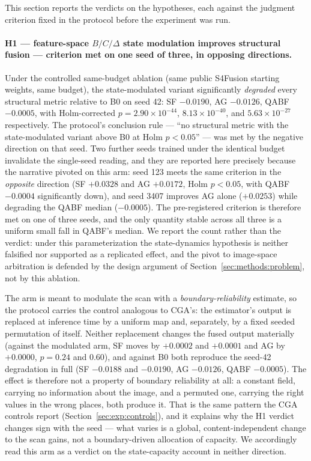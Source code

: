 \documentclass[pdflatex,sn-mathphys-num]{sn-jnl}
\theoremstyle{thmstyleone}%
\theoremstyle{thmstyletwo}%
\theoremstyle{thmstylethree}%
\begin{document}
This section reports the verdicts on the hypotheses, each against the judgment criterion fixed in the protocol before the experiment was run.

\paragraph{H1 --- feature-space $B/C/\Delta$ state modulation improves structural fusion --- criterion met on one seed of three, in opposing directions.}
Under the controlled same-budget ablation (same public S4Fusion starting weights, same budget), the state-modulated variant significantly \emph{degraded} every structural metric relative to B0 on seed 42: SF $-0.0190$, AG $-0.0126$, QABF $-0.0005$, with Holm-corrected $p = 2.90\times10^{-44}$, $8.13\times10^{-40}$, and $5.63\times10^{-27}$ respectively. The protocol's conclusion rule --- ``no structural metric with the state-modulated variant above B0 at Holm $p<0.05$'' --- was met by the negative direction on that seed. Two further seeds trained under the identical budget invalidate the single-seed reading, and they are reported here precisely because the narrative pivoted on this arm: seed 123 meets the same criterion in the \emph{opposite} direction (SF $+0.0328$ and AG $+0.0172$, Holm $p<0.05$, with QABF $-0.0004$ significantly down), and seed 3407 improves AG alone ($+0.0253$) while degrading the QABF median ($-0.0005$). The pre-registered criterion is therefore met on one of three seeds, and the only quantity stable across all three is a uniform small fall in QABF's median. We report the count rather than the verdict: under this parameterization the state-dynamics hypothesis is neither falsified nor supported as a replicated effect, and the pivot to image-space arbitration is defended by the design argument of Section~\ref{sec:methods:problem}, not by this ablation.

The arm is meant to modulate the scan with a \emph{boundary-reliability} estimate, so the protocol carries the control analogous to CGA's: the estimator's output is replaced at inference time by a uniform map and, separately, by a fixed seeded permutation of itself. Neither replacement changes the fused output materially (against the modulated arm, SF moves by $+0.0002$ and $+0.0001$ and AG by $+0.0000$, $p = 0.24$ and $0.60$), and against B0 both reproduce the seed-42 degradation in full (SF $-0.0188$ and $-0.0190$, AG $-0.0126$, QABF $-0.0005$). The effect is therefore not a property of boundary reliability at all: a constant field, carrying no information about the image, and a permuted one, carrying the right values in the wrong places, both produce it. That is the same pattern the CGA controls report (Section~\ref{sec:exp:controls}), and it explains why the H1 verdict changes sign with the seed --- what varies is a global, content-independent change to the scan gains, not a boundary-driven allocation of capacity. We accordingly read this arm as a verdict on the state-capacity account in neither direction.
\end{document}
